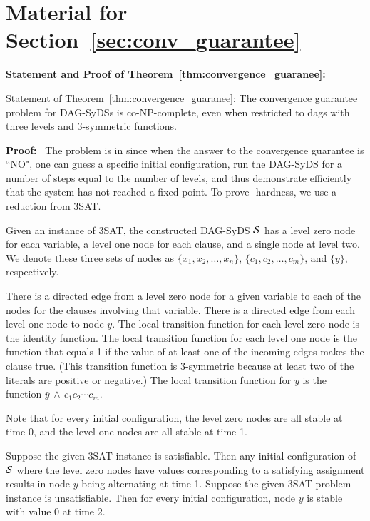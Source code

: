\bigskip


\section{Material for Section~\ref{sec:conv_guarantee}}

\medskip

\noindent
\textbf{Statement and Proof of Theorem~\ref{thm:convergence_guaranee}:}

\medskip

\noindent
\underline{Statement of Theorem~\ref{thm:convergence_guaranee}:}
The convergence guarantee problem for DAG-SyDSs is co-NP-complete,
even when restricted to dags with three levels and 3-symmetric functions.

\medskip

\noindent
\textbf{Proof:}~ The problem is in \cconp{} since when the answer to the
convergence guarantee is ``NO", one can guess a specific initial configuration,
run the DAG-SyDS for a number of steps equal to the number of levels, and
thus demonstrate efficiently that the system has not reached a fixed point.
To prove \cnp-hardness, we use a reduction from 3SAT.

Given an instance of 3SAT,
the constructed DAG-SyDS $\mbox{$\mathcal{S}$}$ has a level zero node for each variable, 
a level one node for each clause, and a single node at level two.
We denote these three sets of nodes as $\{x_1, x_2, \ldots , x_n\}$,
$\{c_1,c_2, \ldots , c_m\}$, and $\{y\}$, respectively.

There is a directed edge from a  level zero node for a given variable
to each of  the nodes for the clauses involving that variable.
There is a directed edge from each level one node to node $y$.  The
local transition function for each level zero node is the identity
function.  The local transition function for each level one node
is the function that equals 1
if the value of at least one of the incoming edges
makes the clause true.  (This transition function is 3-symmetric
because at least two of the literals are positive or negative.) The
local transition function for $y$ is the function 
$\bar{y} \, \wedge \, c_1 c_2 \cdots  c_{m}$.

Note that for every initial configuration, the level zero nodes are
all stable at time 0, and the level one nodes are all stable at
time 1.

\smallskip

Suppose the given 3SAT instance is satisfiable.
Then any initial configuration of $\mbox{$\mathcal{S}$}$ where the level zero nodes 
have values corresponding to a satisfying assignment
results in node $y$ being alternating at time 1.
Suppose the given 3SAT problem instance is unsatisfiable.
Then for every initial configuration, node $y$ is stable with value 0 at time 2.

